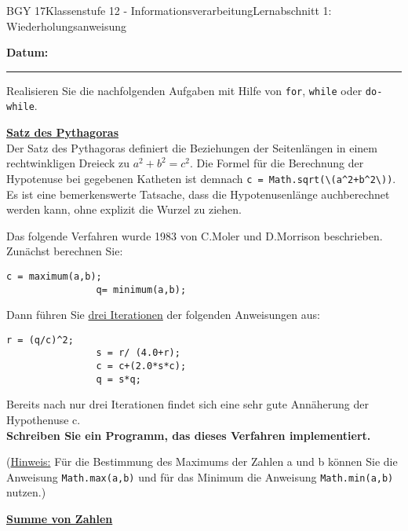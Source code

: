 \documentclass[oneside,openany,headings=optiontotoc,11pt,numbers=noenddot]{scrreprt}
\begin{document}
	\begin{worksheet}{BGY 17}{Klassenstufe 12 - Informationsverarbeitung}{Lernabschnitt 1: Wiederholungsanweisung}
				
		\noindent
		\sffamily
		\textbf{Datum:}
		\rule{0.91\textwidth}{0.4pt}
		\begin{framed}
			\noindent
			Realisieren Sie die nachfolgenden Aufgaben mit Hilfe von \lstinline[style=JavaInputStyle]{for}, \lstinline[style=JavaInputStyle]{while} oder \lstinline[style=JavaInputStyle]{do-while}.\\
			\par\noindent
			\textbf{\underline{Satz des Pythagoras}}\\
			Der Satz des Pythagoras definiert die Beziehungen der Seitenlängen in einem rechtwinkligen Dreieck zu \(a^2 + b^2 = c^2\). Die Formel für die Berechnung der Hypotenuse bei gegebenen Katheten ist demnach \lstinline[style=JavaInputStyle]{c = Math.sqrt(\(a^2+b^2\))}. Es ist eine bemerkenswerte Tatsache, dass die Hypotenusenlänge auchberechnet werden kann, ohne explizit die Wurzel zu ziehen.\\
			\par\noindent
			Das folgende Verfahren wurde 1983 von C.Moler und D.Morrison beschrieben.\\Zunächst berechnen Sie:
			\begin{lstlisting}[style=JavaInputStyle]
				c = maximum(a,b);
				q= minimum(a,b);
			\end{lstlisting}
			Dann führen Sie \underline{drei Iterationen} der folgenden Anweisungen aus:
			\begin{lstlisting}[style=JavaInputStyle]
				r = (q/c)^2;
				s = r/ (4.0+r);
				c = c+(2.0*s*c);
				q = s*q;
			\end{lstlisting}
			\par\noindent
			Bereits nach nur drei Iterationen findet sich eine sehr gute Annäherung der Hypothenuse c.\\
			\textbf{Schreiben Sie ein Programm, das dieses Verfahren implementiert.}\\
			\par\noindent
			(\underline{Hinweis:} Für die Bestimmung des Maximums der Zahlen a und b können Sie die Anweisung \lstinline[style=JavaInputStyle]{Math.max(a,b)} und für das Minimum die Anweisung \lstinline[style=JavaInputStyle]{Math.min(a,b)} nutzen.)\\
			\par\bigskip\noindent
			\textbf{\underline{Summe von Zahlen}}\\

\end{framed}
\end{worksheet}
\end{document}
